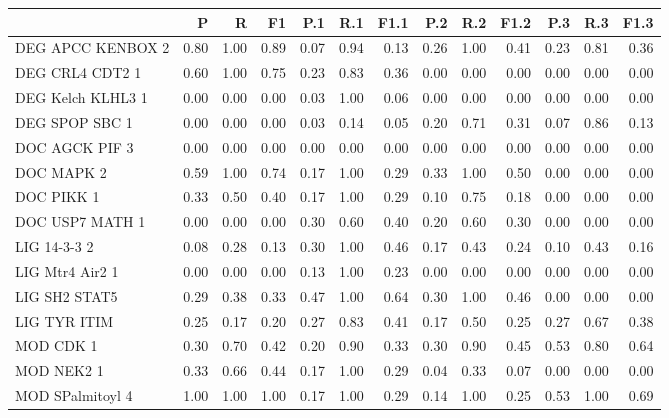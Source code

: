 \begin{tabular}{lrrrrrrrrrrrr}
\toprule
{} &     P &     R &    F1 &   P.1 &   R.1 &  F1.1 &   P.2 &   R.2 &  F1.2 &   P.3 &   R.3 &  F1.3 \\
\midrule
DEG APCC KENBOX 2     &  0.80 &  1.00 &  0.89 &  0.07 &  0.94 &  0.13 &  0.26 &  1.00 &  0.41 &  0.23 &  0.81 &  0.36 \\
DEG CRL4 CDT2 1       &  0.60 &  1.00 &  0.75 &  0.23 &  0.83 &  0.36 &  0.00 &  0.00 &  0.00 &  0.00 &  0.00 &  0.00 \\
DEG Kelch KLHL3 1     &  0.00 &  0.00 &  0.00 &  0.03 &  1.00 &  0.06 &  0.00 &  0.00 &  0.00 &  0.00 &  0.00 &  0.00 \\
DEG SPOP SBC 1        &  0.00 &  0.00 &  0.00 &  0.03 &  0.14 &  0.05 &  0.20 &  0.71 &  0.31 &  0.07 &  0.86 &  0.13 \\
DOC AGCK PIF 3        &  0.00 &  0.00 &  0.00 &  0.00 &  0.00 &  0.00 &  0.00 &  0.00 &  0.00 &  0.00 &  0.00 &  0.00 \\
DOC MAPK 2            &  0.59 &  1.00 &  0.74 &  0.17 &  1.00 &  0.29 &  0.33 &  1.00 &  0.50 &  0.00 &  0.00 &  0.00 \\
DOC PIKK 1            &  0.33 &  0.50 &  0.40 &  0.17 &  1.00 &  0.29 &  0.10 &  0.75 &  0.18 &  0.00 &  0.00 &  0.00 \\
DOC USP7 MATH 1       &  0.00 &  0.00 &  0.00 &  0.30 &  0.60 &  0.40 &  0.20 &  0.60 &  0.30 &  0.00 &  0.00 &  0.00 \\
LIG 14-3-3 2          &  0.08 &  0.28 &  0.13 &  0.30 &  1.00 &  0.46 &  0.17 &  0.43 &  0.24 &  0.10 &  0.43 &  0.16 \\
LIG Mtr4 Air2 1       &  0.00 &  0.00 &  0.00 &  0.13 &  1.00 &  0.23 &  0.00 &  0.00 &  0.00 &  0.00 &  0.00 &  0.00 \\
LIG SH2 STAT5         &  0.29 &  0.38 &  0.33 &  0.47 &  1.00 &  0.64 &  0.30 &  1.00 &  0.46 &  0.00 &  0.00 &  0.00 \\
LIG TYR ITIM          &  0.25 &  0.17 &  0.20 &  0.27 &  0.83 &  0.41 &  0.17 &  0.50 &  0.25 &  0.27 &  0.67 &  0.38 \\
MOD CDK 1             &  0.30 &  0.70 &  0.42 &  0.20 &  0.90 &  0.33 &  0.30 &  0.90 &  0.45 &  0.53 &  0.80 &  0.64 \\
MOD NEK2 1            &  0.33 &  0.66 &  0.44 &  0.17 &  1.00 &  0.29 &  0.04 &  0.33 &  0.07 &  0.00 &  0.00 &  0.00 \\
MOD SPalmitoyl 4      &  1.00 &  1.00 &  1.00 &  0.17 &  1.00 &  0.29 &  0.14 &  1.00 &  0.25 &  0.53 &  1.00 &  0.69 \\

\end{tabular}
